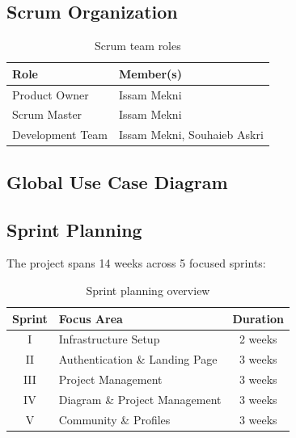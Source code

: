 \subsection{Scrum Organization}

\begin{table}[h!]
    \centering
    \begin{tabular}{|l|l|}
        \hline
        \textbf{Role}          & \textbf{Member(s)}             \\ \hline
        Product Owner          & Issam Mekni                   \\ \hline
        Scrum Master           & Issam Mekni                   \\ \hline
        Development Team       & Issam Mekni, Souhaieb Askri   \\ \hline
    \end{tabular}
    \caption{Scrum team roles}
\end{table}


\subsection{Global Use Case Diagram}
\subsection{Sprint Planning}

The project spans 14 weeks across 5 focused sprints:

\begin{table}[h!]
    \centering
    \begin{tabular}{|c|l|c|}
        \hline
        \textbf{Sprint} & \textbf{Focus Area} & \textbf{Duration} \\ \hline
        I & Infrastructure Setup & 2 weeks \\ \hline
        II & Authentication \& Landing Page & 3 weeks \\ \hline
        III & Project Management & 3 weeks \\ \hline
        IV & Diagram \& Project Management & 3 weeks \\ \hline
        V & Community \& Profiles & 3 weeks \\ \hline
    \end{tabular}
    \caption{Sprint planning overview}
\end{table}

